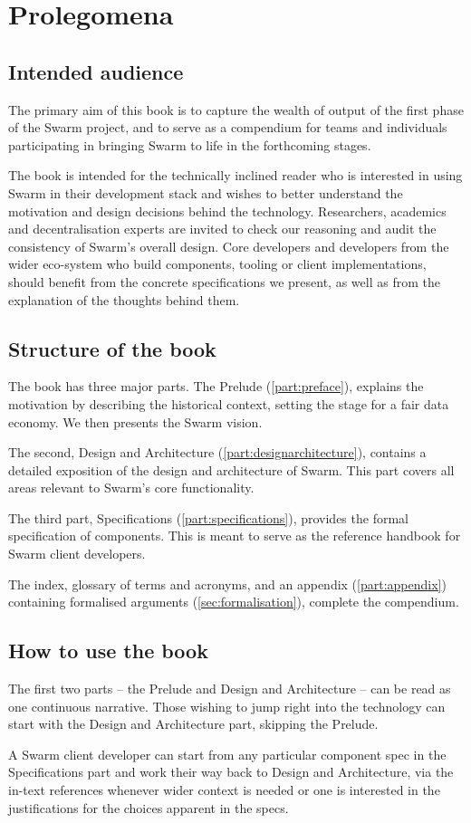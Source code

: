 \chapter{Prolegomena \statusgreen}
\green{}
\section*{Intended audience \statusgreen}
The primary aim of this book is to capture the wealth of output of the first phase of the Swarm project, and to serve as a compendium for teams and individuals participating in bringing Swarm to life in the forthcoming stages.

The book is intended for the technically inclined reader who is interested in using Swarm in their development stack and wishes to better understand the motivation and design decisions behind the technology. Researchers, academics and decentralisation experts are invited to check our reasoning and audit the consistency of Swarm's overall design. Core developers and developers from the wider eco-system who build components, tooling or client implementations, should benefit from the concrete specifications we present, as well as from the explanation of the thoughts behind them.

\section*{Structure of the book \statusgreen}

The book has three major parts. The Prelude (\ref{part:preface}), explains the motivation by describing the historical context, setting the stage for a fair data economy. We then presents the Swarm vision.

The second, Design and Architecture (\ref{part:designarchitecture}), contains a detailed exposition of the design and architecture of Swarm. This part covers all areas relevant to Swarm's core functionality.

The third part, Specifications (\ref{part:specifications}), provides the formal specification of components. This is meant to serve as the reference handbook for Swarm client developers.

The index, glossary of terms and acronyms, and an appendix (\ref{part:appendix}) containing formalised arguments (\ref{sec:formalisation}), complete the compendium.

\section*{How to use the book \statusgreen}

The first two parts – the Prelude and  Design and Architecture – can be read as one continuous narrative. Those wishing to jump right into the technology can start with the Design and Architecture part, skipping the Prelude.

A Swarm client developer can start from any particular component spec in the Specifications part and work their way back to Design and Architecture, via the in-text references whenever wider context is needed or one is interested in the justifications for the choices apparent in the specs.
